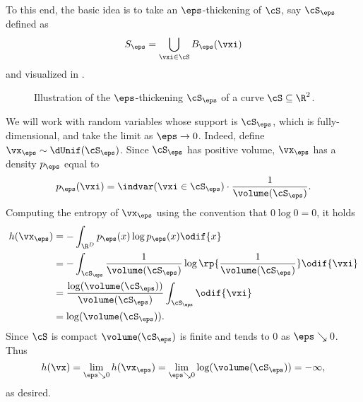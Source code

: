 \documentclass[../../book-main.tex]{subfiles}
\begin{document}
To this end, the basic idea is to take an \(\eps\)-thickening of \(\cS\), say \(\cS_{\eps}\) defined as 
\begin{equation}
    S_{\eps} = \bigcup_{\vxi \in \cS}B_{\eps}(\vxi)
\end{equation}
and visualized in .
\begin{figure}[th]
    \centering
    \caption{Illustration of the \(\eps\)-thickening \(\cS_\eps\) of a curve \(\cS \subseteq \R^{2}\).}
    \label{fig:entropy_eps_thickening}
\end{figure}
We will work with random variables whose support is \(\cS_{\eps}\), which is fully-dimensional, and take the limit as \(\eps \to 0\). Indeed, define \(\vx_{\eps} \sim \dUnif(\cS_{\eps})\). Since \(\cS_{\eps}\) has positive volume, \(\vx_{\eps}\) has a density \(p_{\eps}\) equal to
\begin{equation}
    p_{\eps}(\vxi) = \indvar(\vxi \in \cS_{\eps}) \cdot \frac{1}{\volume(\cS_{\eps})}.
\end{equation}
Computing the entropy of \(\vx_{\eps}\) using the convention that \(0 \log 0 = 0\), it holds
\begin{align}
    h(\vx_{\eps}) 
    &= -\int_{\R^{D}}p_{\eps}(x)\log p_{\eps}(x)\odif{x} \\ 
    &= -\int_{\cS_{\eps}}\frac{1}{\volume(\cS_{\eps})} \log\rp{\frac{1}{\volume(\cS_{\eps})}}\odif{\vxi} \\ 
    &= \frac{\log(\volume(\cS_{\eps}))}{\volume(\cS_{\eps})}\int_{\cS_{\eps}}\odif{\vxi} \\ 
    &= \log(\volume(\cS_{\eps})).
\end{align}
Since \(\cS\) is compact \(\volume(\cS_{\eps})\) is finite and tends to \(0\) as \(\eps \searrow 0\). Thus
\begin{equation}
    h(\vx) = \lim_{\eps \searrow 0}h(\vx_{\eps}) = \lim_{\eps \searrow 0}\log(\volume(\cS_{\eps})) = -\infty,
\end{equation}
as desired.
\end{document}
